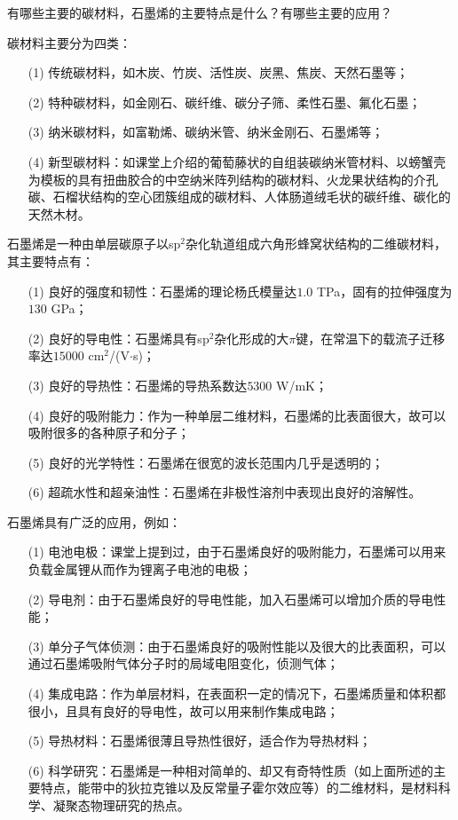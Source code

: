 \documentclass{assignment}
\begin{document}
\begin{ti}
    有哪些主要的碳材料，石墨烯的主要特点是什么？有哪些主要的应用？
\end{ti}
\begin{da}
    碳材料主要分为四类：
    \begin{itemize}
        \item[(1)] 传统碳材料，如木炭、竹炭、活性炭、炭黑、焦炭、天然石墨等；
        \item[(2)] 特种碳材料，如金刚石、碳纤维、碳分子筛、柔性石墨、氟化石墨；
        \item[(3)] 纳米碳材料，如富勒烯、碳纳米管、纳米金刚石、石墨烯等；
        \item[(4)] 新型碳材料：如课堂上介绍的葡萄藤状的自组装碳纳米管材料、以螃蟹壳为模板的具有扭曲胶合的中空纳米阵列结构的碳材料、火龙果状结构的介孔碳、石榴状结构的空心团簇组成的碳材料、人体肠道绒毛状的碳纤维、碳化的天然木材。
    \end{itemize}

    石墨烯是一种由单层碳原子以sp$^2$杂化轨道组成六角形蜂窝状结构的二维碳材料，其主要特点有：
    \begin{itemize}
        \item[(1)] 良好的强度和韧性：石墨烯的理论杨氏模量达$1.0$ TPa，固有的拉伸强度为$130$ GPa；
        \item[(2)] 良好的导电性：石墨烯具有sp$^2$杂化形成的大$\pi$键，在常温下的载流子迁移率达$15000$ cm$^2$/(V$\cdot$s)；
        \item[(3)] 良好的导热性：石墨烯的导热系数达$5300$ W/mK；
        \item[(4)] 良好的吸附能力：作为一种单层二维材料，石墨烯的比表面很大，故可以吸附很多的各种原子和分子；
        \item[(5)] 良好的光学特性：石墨烯在很宽的波长范围内几乎是透明的；
        \item[(6)] 超疏水性和超亲油性：石墨烯在非极性溶剂中表现出良好的溶解性。
    \end{itemize}

    石墨烯具有广泛的应用，例如：
    \begin{itemize}
        \item[(1)] 电池电极：课堂上提到过，由于石墨烯良好的吸附能力，石墨烯可以用来负载金属锂从而作为锂离子电池的电极；
        \item[(2)] 导电剂：由于石墨烯良好的导电性能，加入石墨烯可以增加介质的导电性能；
        \item[(3)] 单分子气体侦测：由于石墨烯良好的吸附性能以及很大的比表面积，可以通过石墨烯吸附气体分子时的局域电阻变化，侦测气体；
        \item[(4)] 集成电路：作为单层材料，在表面积一定的情况下，石墨烯质量和体积都很小，且具有良好的导电性，故可以用来制作集成电路；
        \item[(5)] 导热材料：石墨烯很薄且导热性很好，适合作为导热材料；
        \item[(6)] 科学研究：石墨烯是一种相对简单的、却又有奇特性质（如上面所述的主要特点，能带中的狄拉克锥以及反常量子霍尔效应等）的二维材料，是材料科学、凝聚态物理研究的热点。
    \end{itemize}
\end{da}
\end{document}
